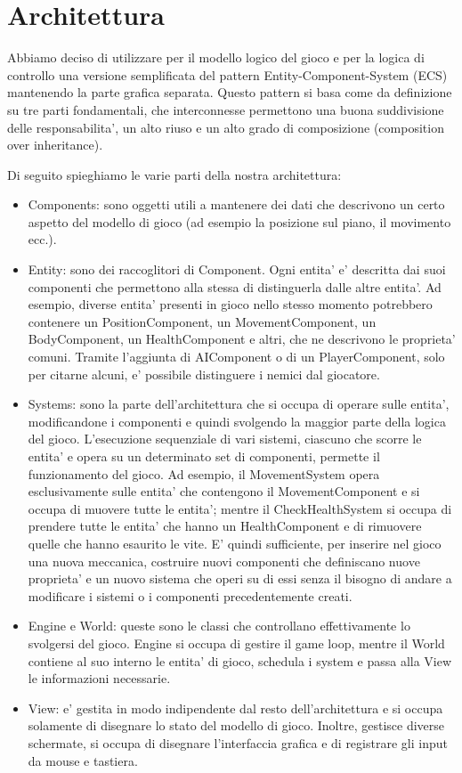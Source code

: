 \documentclass[a4paper,12pt]{report}
\begin{document}
\section{Architettura}
Abbiamo deciso di utilizzare per il modello logico del gioco e per la logica di controllo una versione semplificata del pattern Entity-Component-System (ECS) mantenendo la parte grafica separata.
Questo pattern si basa come da definizione su tre parti fondamentali, che interconnesse permettono una buona suddivisione delle responsabilita', un alto riuso e un alto grado di composizione (composition over inheritance).



Di seguito spieghiamo le varie parti della nostra architettura:
\begin{itemize}
	\item Components: sono oggetti utili a mantenere dei dati che descrivono un certo aspetto del modello di gioco (ad esempio la posizione sul piano, il movimento ecc.). 
	\item Entity: sono dei raccoglitori di Component. Ogni entita' e' descritta dai suoi componenti che permettono alla stessa di distinguerla dalle altre entita'. Ad esempio, diverse entita' presenti in gioco nello stesso momento potrebbero contenere un PositionComponent, un MovementComponent, un BodyComponent, un HealthComponent e altri, che ne descrivono le proprieta' comuni. Tramite l'aggiunta di AIComponent o di un PlayerComponent, solo per citarne alcuni, e' possibile distinguere i nemici dal giocatore. 
	\item Systems: sono la parte dell'architettura che si occupa di operare sulle entita', modificandone i componenti e quindi svolgendo la maggior parte della logica del gioco. L'esecuzione sequenziale di vari sistemi, ciascuno che scorre le entita' e opera su un determinato set di componenti, permette il funzionamento del gioco. Ad esempio, il MovementSystem opera esclusivamente sulle entita' che contengono il MovementComponent e si occupa di muovere tutte le entita'; mentre il CheckHealthSystem si occupa di prendere tutte le entita' che hanno un HealthComponent e di rimuovere quelle che hanno esaurito le vite. E' quindi sufficiente, per inserire nel gioco una nuova meccanica, costruire nuovi componenti che definiscano nuove proprieta' e un nuovo sistema che operi su di essi senza il bisogno di andare a modificare i sistemi o i componenti precedentemente creati.
	\item Engine e World: queste sono le classi che controllano effettivamente lo svolgersi del gioco. Engine si occupa di gestire il game loop, mentre il World contiene al suo interno le entita' di gioco, schedula i system e passa alla View le informazioni necessarie.
	\item View: e' gestita in modo indipendente dal resto dell'architettura e si occupa solamente di disegnare lo stato del modello di gioco. Inoltre, gestisce diverse schermate, si occupa di disegnare l'interfaccia grafica e di registrare gli input da mouse e tastiera.
\end{itemize}
\end{document}
